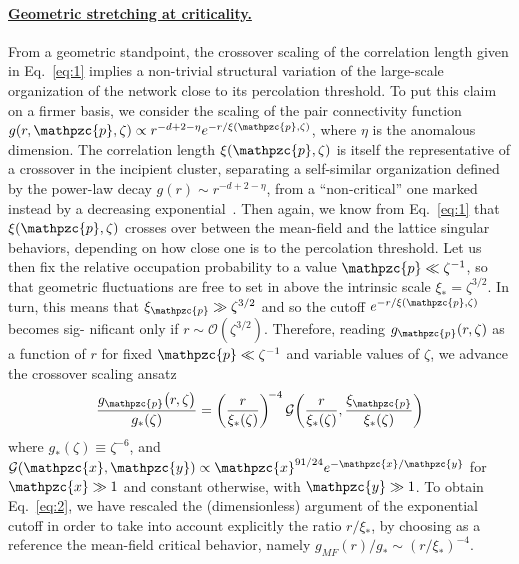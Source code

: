 \documentclass[aps, groupedaddress, superscriptaddress, prl, reprint]{revtex4-1}
\begin{document}
\paragraph*{\underline{Geometric stretching at criticality.}} 
From a geometric standpoint, the crossover scaling of the correlation length given in Eq.~\eqref{eq:1} implies a non-trivial structural variation of the large-scale organization of the network close to its percolation threshold. 
To put this claim on a firmer basis, we consider the scaling of the pair connectivity function $g(r,\mathpzc{p},\zeta)\propto r^{-d+2-\eta}e^{-r/\xi(\mathpzc{p},\zeta)}$, where $\eta$ is the anomalous dimension. 
The correlation length $\xi(\mathpzc{p},\zeta)$ is itself the representative of a crossover in the incipient cluster, separating a self-similar organization defined by the power-law decay $g(r)\sim r^{-d+2-\eta}$, from a ``non-critical'' one marked instead by a decreasing exponential~\cite{Stauf14}. 
Then again, we know from Eq.~\eqref{eq:1} that $\xi(\mathpzc{p},\zeta)$ crosses over between the mean-field and the lattice singular behaviors, depending on how close one is to the percolation threshold. 
Let us then fix the relative occupation probability to a value $\mathpzc{p}\ll\zeta^{-1}$, so that geometric fluctuations are free to set in above the intrinsic scale $\xi_*=\zeta^{3/2}$. 
In turn, this means that $\xi_\mathpzc{p}\gg\zeta^{3/2}$ and so the cutoff $e^{-r/\xi(\mathpzc{p},\zeta)}$ becomes sig-\vspace{-0.05cm}
\noindent 
nificant only if $r\sim\mathcal{O}(\zeta^{3/2})$. 
Therefore, reading $g_\mathpzc{p}(r,\zeta)$ as a function of $r$ for fixed $\mathpzc{p}\ll\zeta^{-1}$ and variable values of $\zeta$, we advance the crossover scaling ansatz
\begin{equation}\label{eq:2}
\frac{g_\mathpzc{p}\big(r,\zeta\big)}{g_*(\zeta)}=\left(\frac{r}{\xi_*(\zeta)}\right)^{\!-4}\mathcal{G}\bigg(\frac{r}{\xi_*(\zeta)},\frac{\xi_\mathpzc{p}}{\xi_*(\zeta)}\bigg)
\end{equation}
\noindent 
where $g_*(\zeta)\equiv \zeta^{-6}$, and $\mathcal{G}(\mathpzc{x},\mathpzc{y})\propto \mathpzc{x}^{91/24}e^{-\mathpzc{x}/\mathpzc{y}}$ for $\mathpzc{x}\gg1$ and constant otherwise, with $\mathpzc{y}\gg1$. 
To obtain Eq.~\eqref{eq:2}, we have rescaled the (dimensionless) argument of the exponential cutoff in order to take into account explicitly the ratio $r/\xi_*$, by choosing as a reference the mean-field critical behavior, namely $g_{MF}(r)/g_*\sim(r/\xi_*)^{-4}$.\\
\indent 
\end{document}
